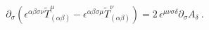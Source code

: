 \begin{equation}
\partial _{\sigma }\left( \epsilon ^{\alpha \beta \sigma \nu }\tilde{T}%
_{(\alpha \beta )}^{\mu }-\epsilon ^{\alpha \beta \sigma \mu }\tilde{T}%
_{(\alpha \beta )}^{\nu }\right) =2\,\epsilon ^{\mu \nu \sigma \delta
}\partial _{\sigma }A_{\delta }\ .  \label{HEQ}
\end{equation}%
